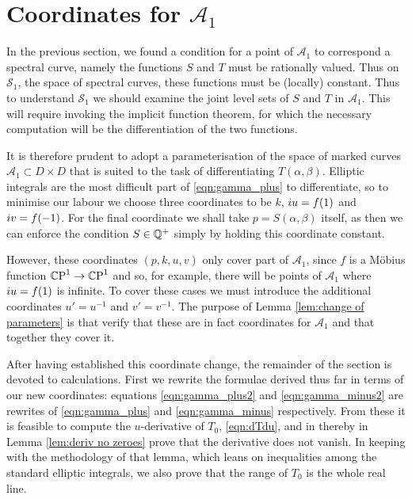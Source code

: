 \section{Coordinates for \texorpdfstring{$\mathcal{A}_1$}{A1}}
\label{sec:Reformulate}

In the previous section, we found a condition for a point of $\mathcal{A}_1$ to correspond a spectral curve, namely the functions $S$ and $T$ must be rationally valued. Thus on $\mathcal{S}_1$, the space of spectral curves, these functions must be (locally) constant. Thus to understand $\mathcal{S}_1$ we should examine the joint level sets of $S$ and $T$ in $\mathcal{A}_1$. This will require invoking the implicit function theorem, for which the necessary computation will be the differentiation of the two functions.

It is therefore prudent to adopt a parameterisation of the space of marked curves $\mathcal{A}_1 \subset D\times D$ that is suited to the task of differentiating $T(α,β)$.
Elliptic integrals are the most difficult part of \eqref{eqn:gamma_plus} to differentiate, so to minimise our labour we choose three coordinates to be $k$, $i u = f(1)$ and $i v = f(-1)$. For the final coordinate we shall take $p=S(α,β)$ itself, as then we can enforce the condition $S\in\Q^+$ simply by holding this coordinate constant.

However, these coordinates $(p,k,u,v)$ only cover part of $\mathcal{A}_1$, since $f$ is a Möbius function $\CP^1 \to \CP^1$ and so, for example, there will be points of $\mathcal{A}_1$ where $i u = f(1)$ is infinite. To cover these cases we must introduce the additional coordinates $u' = u^{-1}$ and $v' = v^{-1}$. The purpose of Lemma \ref{lem:change of parameters} is that verify that these are in fact coordinates for $\mathcal{A}_1$ and that together they cover it.

After having established this coordinate change, the remainder of the section is devoted to calculations. First we rewrite the formulae derived thus far in terms of our new coordinates: equations \eqref{eqn:gamma_plus2} and \eqref{eqn:gamma_minus2} are rewrites of \eqref{eqn:gamma_plus} and \eqref{eqn:gamma_minus} respectively. From these it is feasible to compute the $u$-derivative of $T_0$, \eqref{eqn:dTdu}, and in thereby in Lemma \ref{lem:deriv no zeroes} prove that the derivative does not vanish. In keeping with the methodology of that lemma, which leans on inequalities among the standard elliptic integrals, we also prove that the range of $T_0$ is the whole real line.

